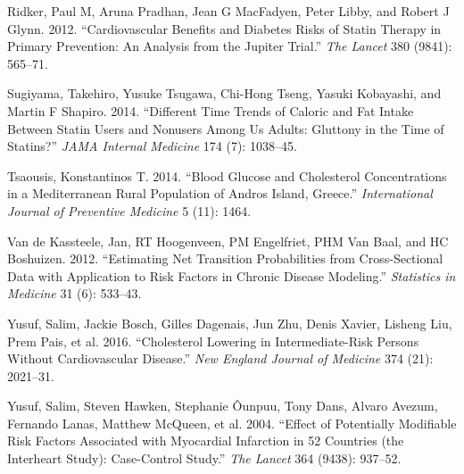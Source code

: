 \documentclass[
  12pt,
]{article}
\begin{document}
\leavevmode\hypertarget{ref-ridker2012}{}%
Ridker, Paul M, Aruna Pradhan, Jean G MacFadyen, Peter Libby, and Robert J Glynn. 2012. ``Cardiovascular Benefits and Diabetes Risks of Statin Therapy in Primary Prevention: An Analysis from the Jupiter Trial.'' \emph{The Lancet} 380 (9841): 565--71.

\leavevmode\hypertarget{ref-sugiyama2014}{}%
Sugiyama, Takehiro, Yusuke Tsugawa, Chi-Hong Tseng, Yasuki Kobayashi, and Martin F Shapiro. 2014. ``Different Time Trends of Caloric and Fat Intake Between Statin Users and Nonusers Among Us Adults: Gluttony in the Time of Statins?'' \emph{JAMA Internal Medicine} 174 (7): 1038--45.

\leavevmode\hypertarget{ref-tsaousis2014}{}%
Tsaousis, Konstantinos T. 2014. ``Blood Glucose and Cholesterol Concentrations in a Mediterranean Rural Population of Andros Island, Greece.'' \emph{International Journal of Preventive Medicine} 5 (11): 1464.

\leavevmode\hypertarget{ref-van2012estimating}{}%
Van de Kassteele, Jan, RT Hoogenveen, PM Engelfriet, PHM Van Baal, and HC Boshuizen. 2012. ``Estimating Net Transition Probabilities from Cross-Sectional Data with Application to Risk Factors in Chronic Disease Modeling.'' \emph{Statistics in Medicine} 31 (6): 533--43.

\leavevmode\hypertarget{ref-yusuf2016}{}%
Yusuf, Salim, Jackie Bosch, Gilles Dagenais, Jun Zhu, Denis Xavier, Lisheng Liu, Prem Pais, et al. 2016. ``Cholesterol Lowering in Intermediate-Risk Persons Without Cardiovascular Disease.'' \emph{New England Journal of Medicine} 374 (21): 2021--31.

\leavevmode\hypertarget{ref-yusuf2004effect}{}%
Yusuf, Salim, Steven Hawken, Stephanie Ôunpuu, Tony Dans, Alvaro Avezum, Fernando Lanas, Matthew McQueen, et al. 2004. ``Effect of Potentially Modifiable Risk Factors Associated with Myocardial Infarction in 52 Countries (the Interheart Study): Case-Control Study.'' \emph{The Lancet} 364 (9438): 937--52.
\end{document}
